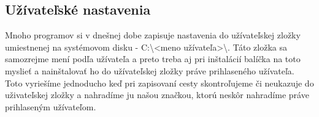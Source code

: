 \subsection{Užívateľské nastavenia}
Mnoho programov si v dnešnej dobe zapisuje nastavenia do užívateľskej zložky umiestnenej na systémovom disku - C:\textbackslashUsers\textbackslash\textless meno užívateľa\textgreater\textbackslash. Táto zložka sa samozrejme mení podľa užívateľa a preto treba aj pri inštalácií balíčka na toto myslieť a nainštalovať ho do užívateľskej zložky práve prihlaseného užívateľa. Toto vyriešíme jednoducho keď pri zapisovaní cesty skontroľujeme či neukazuje do uživateľskej zložky a nahradíme ju našou značkou, ktorú neskôr nahradíme práve prihlaseným užívateľom.